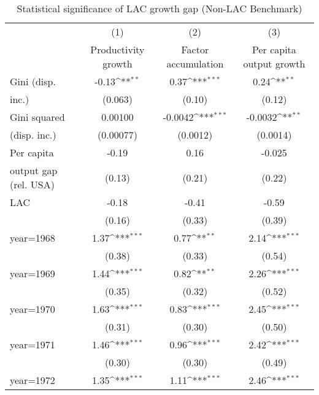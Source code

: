 \begin{sidewaystable}[htbp]\centering
\def\sym#1{\ifmmode^{#1}\else\(^{#1}\)\fi}
\caption{Statistical significance of LAC growth gap (Non-LAC Benchmark)}
\begin{tabular}{l*{3}{c}}
\toprule
                &\multicolumn{1}{c}{(1)}&\multicolumn{1}{c}{(2)}&\multicolumn{1}{c}{(3)}\\
                &\multicolumn{1}{c}{Productivity growth}&\multicolumn{1}{c}{Factor accumulation}&\multicolumn{1}{c}{Per capita output growth}\\
\midrule
Gini (disp.     &    -0.13\sym{**} &     0.37\sym{***}&     0.24\sym{**} \\
inc.)           &  (0.063)         &   (0.10)         &   (0.12)         \\
\addlinespace
Gini squared    &  0.00100         &  -0.0042\sym{***}&  -0.0032\sym{**} \\
(disp. inc.)    &(0.00077)         & (0.0012)         & (0.0014)         \\
\addlinespace
Per capita      &    -0.19         &     0.16         &   -0.025         \\
output gap (rel. USA)&   (0.13)         &   (0.21)         &   (0.22)         \\
\addlinespace
LAC             &    -0.18         &    -0.41         &    -0.59         \\
                &   (0.16)         &   (0.33)         &   (0.39)         \\
\addlinespace
year=1968       &     1.37\sym{***}&     0.77\sym{**} &     2.14\sym{***}\\
                &   (0.38)         &   (0.33)         &   (0.54)         \\
\addlinespace
year=1969       &     1.44\sym{***}&     0.82\sym{**} &     2.26\sym{***}\\
                &   (0.35)         &   (0.32)         &   (0.52)         \\
\addlinespace
year=1970       &     1.63\sym{***}&     0.83\sym{***}&     2.45\sym{***}\\
                &   (0.31)         &   (0.30)         &   (0.50)         \\
\addlinespace
year=1971       &     1.46\sym{***}&     0.96\sym{***}&     2.42\sym{***}\\
                &   (0.30)         &   (0.30)         &   (0.49)         \\
\addlinespace
year=1972       &     1.35\sym{***}&     1.11\sym{***}&     2.46\sym{***}\\

\end{tabular}
\end{sidewaystable}
